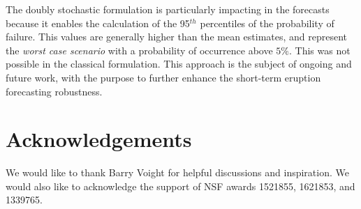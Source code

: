 \documentclass{article}
\begin{document}
The doubly stochastic formulation is particularly impacting in the forecasts because it enables the calculation of the 95$^{th}$ percentiles of the probability of failure. This values are generally higher than the mean estimates, and represent the \emph{worst case scenario} with a probability of occurrence above $5\%$. This was not possible in the classical formulation. This approach is the subject of ongoing and future work, with the purpose to further enhance the short-term eruption forecasting robustness.

\section*{Acknowledgements}
We would like to thank Barry Voight for helpful discussions and inspiration. We would also like to acknowledge the support of NSF awards 1521855, 1621853, and 1339765.


\appendix
\end{document}
